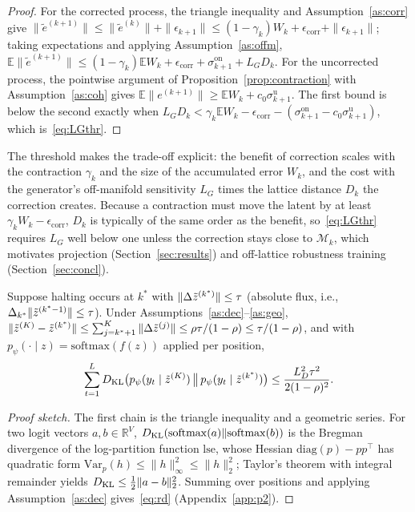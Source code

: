 \begin{proof}
For the corrected process, the triangle inequality and Assumption~\ref{as:corr} give $\|\tilde e^{(k+1)}\|\le\|\tilde e^{(k)}\|+\|\epsilon_{k+1}\|\le(1-\gamma_k)W_k+\epsilon_{\mathrm{corr}}+\|\epsilon_{k+1}\|$; taking expectations and applying Assumption~\ref{as:offm}, $\mathbb{E}\|\tilde e^{(k+1)}\|\le(1-\gamma_k)\mathbb{E}W_k+\epsilon_{\mathrm{corr}}+\sigma^{\mathrm{on}}_{k+1}+L_GD_k$. For the uncorrected process, the pointwise argument of Proposition~\ref{prop:contraction} with Assumption~\ref{as:coh} gives $\mathbb{E}\|e^{(k+1)}\|\ge\mathbb{E}W_k+c_0\sigma^{\mathrm{u}}_{k+1}$. The first bound is below the second exactly when $L_GD_k<\gamma_k\mathbb{E}W_k-\epsilon_{\mathrm{corr}}-(\sigma^{\mathrm{on}}_{k+1}-c_0\sigma^{\mathrm{u}}_{k+1})$, which is~\eqref{eq:LGthr}.
\end{proof}
The threshold makes the trade-off explicit: the benefit of correction scales with the contraction $\gamma_k$ and the size of the accumulated error $W_k$, and the cost with the generator's off-manifold sensitivity $L_G$ times the lattice distance $D_k$ the correction creates. Because a contraction must move the latent by at least $\gamma_k W_k-\epsilon_{\mathrm{corr}}$, $D_k$ is typically of the same order as the benefit, so~\eqref{eq:LGthr} requires $L_G$ well below one unless the correction stays close to $\mathcal{M}_k$, which motivates projection (Section~\ref{sec:results}) and off-lattice robustness training (Section~\ref{sec:concl}).

\begin{proposition}\label{prop:rd}
Suppose halting occurs at $k^\ast$ with $\|\Delta\tilde{z}^{(k^\ast)}\|\le\tau$ (absolute flux, i.e., $\Delta_{k^\ast}\|\tilde{z}^{(k^\ast-1)}\|\le\tau$). Under Assumptions~\ref{as:dec}--\ref{as:geo}, $\|\tilde{z}^{(K)}-\tilde{z}^{(k^\ast)}\|\le\sum_{j=k^\ast+1}^{K}\|\Delta\tilde{z}^{(j)}\|\le\rho\tau/(1-\rho)\le\tau/(1-\rho)$, and with $p_\psi(\cdot\mid z)=\mathrm{softmax}(f(z))$ applied per position,
\begin{equation}
\sum_{t=1}^{L}D_{\mathrm{KL}}\big(p_\psi(y_t\mid\tilde{z}^{(K)})\,\big\|\,p_\psi(y_t\mid\tilde{z}^{(k^\ast)})\big)\le\frac{L_D^2\tau^2}{2(1-\rho)^2}. \label{eq:rd}
\end{equation}
\end{proposition}
\begin{proof}[Proof sketch]
The first chain is the triangle inequality and a geometric series. For two logit vectors $a,b\in\mathbb{R}^{V}$, $D_{\mathrm{KL}}(\mathrm{softmax}(a)\|\mathrm{softmax}(b))$ is the Bregman divergence of the log-partition function $\mathrm{lse}$, whose Hessian $\mathrm{diag}(p)-pp^\top$ has quadratic form $\mathrm{Var}_p(h)\le\|h\|_\infty^2\le\|h\|_2^2$; Taylor's theorem with integral remainder yields $D_{\mathrm{KL}}\le\frac12\|a-b\|_2^2$. Summing over positions and applying Assumption~\ref{as:dec} gives~\eqref{eq:rd} (Appendix~\ref{app:p2}).
\end{proof}

